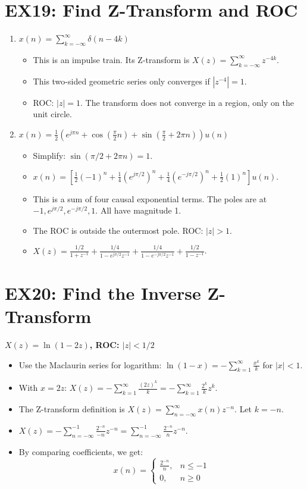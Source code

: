 \documentclass[a4paper,12pt]{article}
\begin{document}
\section*{EX19: Find Z-Transform and ROC}
\begin{enumerate}
    \item \textbf{$x(n) = \sum_{k=-\infty}^{\infty} \delta(n-4k)$}
        \begin{itemize}
            \item This is an impulse train. Its Z-transform is $X(z) = \sum_{k=-\infty}^{\infty} z^{-4k}$.
            \item This two-sided geometric series only converges if $|z^{-4}|=1$.
            \item ROC: $|z|=1$. The transform does not converge in a region, only on the unit circle.
        \end{itemize}
    \item \textbf{$x(n) = \frac{1}{2} (e^{j\pi n} + \cos(\frac{\pi}{2}n) + \sin(\frac{\pi}{2}+2\pi n))u(n)$}
        \begin{itemize}
            \item Simplify: $\sin(\pi/2+2\pi n) = 1$.
            \item $x(n) = [\frac{1}{2}(-1)^n + \frac{1}{4}(e^{j\pi/2})^n + \frac{1}{4}(e^{-j\pi/2})^n + \frac{1}{2}(1)^n] u(n)$.
            \item This is a sum of four causal exponential terms. The poles are at $-1, e^{j\pi/2}, e^{-j\pi/2}, 1$. All have magnitude 1.
            \item The ROC is outside the outermost pole. ROC: $|z|>1$.
            \item $X(z) = \frac{1/2}{1+z^{-1}} + \frac{1/4}{1-e^{j\pi/2}z^{-1}} + \frac{1/4}{1-e^{-j\pi/2}z^{-1}} + \frac{1/2}{1-z^{-1}}$.
        \end{itemize}
\end{enumerate}


\section*{EX20: Find the Inverse Z-Transform}
\textbf{$X(z) = \ln(1 - 2z)$, ROC: $|z| < 1/2$}
\begin{itemize}
    \item Use the Maclaurin series for logarithm: $\ln(1-x) = -\sum_{k=1}^{\infty} \frac{x^k}{k}$ for $|x|<1$.
    \item With $x=2z$: $X(z) = -\sum_{k=1}^{\infty} \frac{(2z)^k}{k} = -\sum_{k=1}^{\infty} \frac{2^k}{k} z^k$.
    \item The Z-transform definition is $X(z) = \sum_{n=-\infty}^{\infty} x(n) z^{-n}$. Let $k=-n$.
    \item $X(z) = -\sum_{n=-\infty}^{-1} \frac{2^{-n}}{-n} z^{-n} = \sum_{n=-\infty}^{-1} \frac{2^{-n}}{n} z^{-n}$.
    \item By comparing coefficients, we get:
    \[ x(n) = \begin{cases} \frac{2^{-n}}{n}, & n \le -1 \\ 0, & n \ge 0 \end{cases} \]
\end{itemize}
\end{document}
